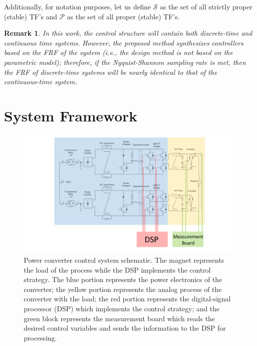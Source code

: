 \documentclass[a4paper, 10pt, conference]{ieeeconf}
\newtheorem*{remark}{Remark}
\begin{document}
Additionally, for notation purposes, let us define $\mathscr{S}$ as the set of all strictly proper (stable) TF's and $\mathscr{P}$ as the set of all proper (stable) TF's. 

\begin{remark}
In this work, the control structure will contain both discrete-time and continuous time systems. However, the proposed method synthesizes controllers based on the FRF of the system (i.e., the design method is not based on the parametric model); therefore, if the Nyquist-Shannon sampling rate is met, then the FRF of discrete-time systems will be nearly identical to that of the continuous-time system.
\end{remark}

\section{System Framework}
\label{sec:system}
\begin{figure}
\centering
\includegraphics[width=1.7\columnwidth]{../pics/voltage_loop_schematic_color_coded}
\caption{Power converter control system schematic. The magnet represents the load of the process while the DSP implements the control strategy. The blue portion represents the power electronics of the converter; the yellow portion represents the analog process of the converter with the load; the red portion represents the digital-signal processor (DSP) which implements the control strategy; and the green block represents the measurement board which reads the desired control variables and sends the information to the DSP for processing.}
\label{fig:circuit}
\end{figure}
\end{document}
